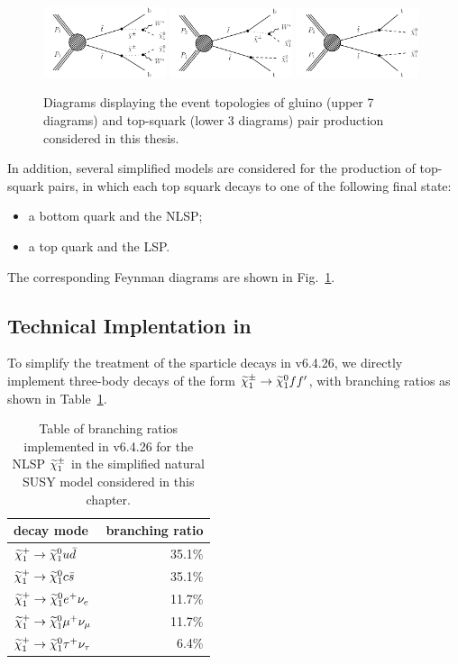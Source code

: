 \begin{figure}[thb!]
\includegraphics[width=0.32\textwidth]{figs/theory/T2bw.pdf}
\includegraphics[width=0.32\textwidth]{figs/theory/T2tb.pdf}
\includegraphics[width=0.32\textwidth]{figs/theory/T2tt.pdf}
\caption{Diagrams displaying the event topologies of gluino (upper 7
  diagrams) and top-squark (lower 3 diagrams) pair production
  considered in this thesis.\label{fig:SMSDiagrams}}
\end{figure}

In addition, several simplified models are considered for
the production of top-squark pairs, in which each top squark decays to
one of the following final state:
 \begin{itemize}
\item a bottom quark and the NLSP;
\item a top quark and the LSP.
\end{itemize}

The corresponding Feynman diagrams are shown in
Fig.~\ref{fig:SMSDiagrams}.

\subsection{Technical Implentation in \PYTHIA}
To simplify the treatment of the sparticle decays in \PYTHIA v6.4.26, we directly implement three-body decays of
the form $\widetilde{\chi}^{\pm}_1 \to \widetilde{\chi}^{0}_1 f f^{\prime}$, with branching ratios
as shown in Table~\ref{tab:nlspbr}.
\begin{table}
\centering
\begin{tabular}{l|r}
decay mode & branching ratio \\\hline
$\widetilde{\chi}^{+}_1 \to \widetilde{\chi}^{0}_1 u \bar d$ &  35.1\%\\
$\widetilde{\chi}^{+}_1 \to \widetilde{\chi}^{0}_1 c \bar s$ &  35.1\%\\
$\widetilde{\chi}^{+}_1 \to \widetilde{\chi}^{0}_1 e^+ \nu_e$ &  11.7\%\\
$\widetilde{\chi}^{+}_1 \to \widetilde{\chi}^{0}_1 \mu^+ \nu_{\mu}$ &  11.7\%\\
$\widetilde{\chi}^{+}_1 \to \widetilde{\chi}^{0}_1 \tau^+ \nu_{\tau}$ &  6.4\%
\end{tabular}
\caption{\label{tab:nlspbr}Table of branching ratios implemented in
  \PYTHIA v6.4.26 for the NLSP
  $\widetilde{\chi}^{\pm}_1$ in the simplified natural SUSY model considered in this chapter.}
\end{table}